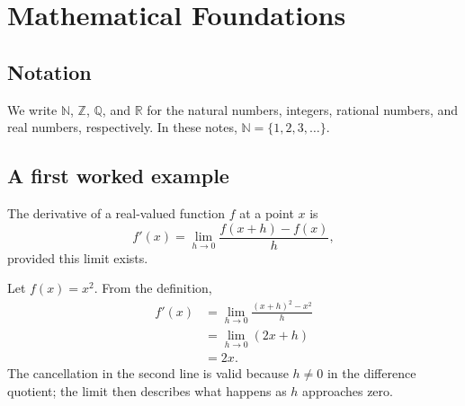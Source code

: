 \chapter{Mathematical Foundations}

\section{Notation}
We write $\mathbb{N}$, $\mathbb{Z}$, $\mathbb{Q}$, and $\mathbb{R}$ for the
natural numbers, integers, rational numbers, and real numbers, respectively.
In these notes, $\mathbb{N}=\{1,2,3,\ldots\}$.

\section{A first worked example}
\begin{definition}
The derivative of a real-valued function $f$ at a point $x$ is
\[
  f'(x)=\lim_{h\to 0}\frac{f(x+h)-f(x)}{h},
\]
provided this limit exists.
\end{definition}

\begin{example}
Let $f(x)=x^2$. From the definition,
\begin{align*}
  f'(x)
    &=\lim_{h\to 0}\frac{(x+h)^2-x^2}{h}\\
    &=\lim_{h\to 0}(2x+h)\\
    &=2x.
\end{align*}
The cancellation in the second line is valid because $h\ne 0$ in the
difference quotient; the limit then describes what happens as $h$
approaches zero.
\end{example}

